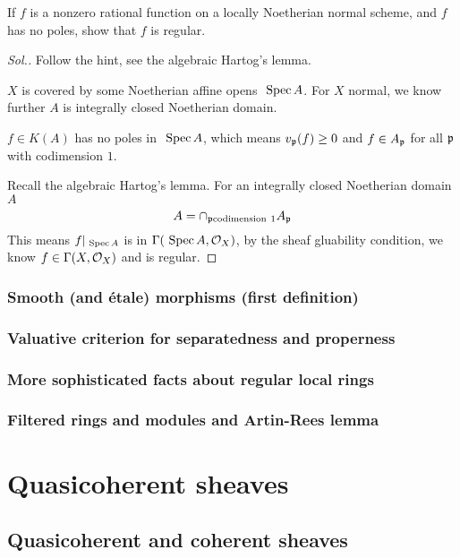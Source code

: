 \documentclass[11pt]{book} %
\begin{document}
\begin{exr}
If $f$ is a nonzero rational function on a locally Noetherian normal scheme, and $f$ has no poles, show that $f$ is regular.
\end{exr}
\begin{proof}[Sol.]
Follow the hint, see the algebraic Hartog's lemma.

$X$ is covered by some Noetherian affine opens $\text{ Spec\,} A$. For $X$ normal, we know further $A$ is integrally closed Noetherian domain. 

$f\in K(A)$ has no poles in $\text{ Spec\,} A$, which means $v_{{\mathfrak p}}(f)\geq 0$ and $f\in A_{\mathfrak p}$ for all ${\mathfrak p}$ with codimension $1$. 

Recall the algebraic Hartog's lemma.
For an integrally closed Noetherian domain $A$
$$
A=\cap_{{\mathfrak p} \text{codimension}\  1} A_{\mathfrak p}
$$
This means $f|_{\text{ Spec\,} A}$ is in $\Gamma(\text{ Spec\,} A,{\cal O}_X)$, by the sheaf gluability condition, we know $f\in \Gamma(X,{\cal O}_X)$ and is regular.
\end{proof}
\section{Smooth (and {\'e}tale) morphisms (first definition)}
\section{Valuative criterion for separatedness and properness}
\section{More sophisticated facts about regular local rings}
\section{Filtered rings and modules and Artin-Rees lemma}
\part{Quasicoherent sheaves}
\chapter{Quasicoherent and coherent sheaves}
\end{document}
